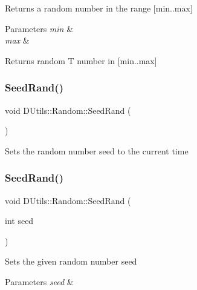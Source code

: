 Returns a random number in the range \mbox{[}min..max\mbox{]} 
\begin{DoxyParams}{Parameters}
{\em min} & \\
\hline
{\em max} & \\
\hline
\end{DoxyParams}
\begin{DoxyReturn}{Returns}
random T number in \mbox{[}min..max\mbox{]} 
\end{DoxyReturn}
\mbox{\label{class_d_utils_1_1_random_a719a6489316343a771e062f0be58050f}} 
\subsubsection{\texorpdfstring{Seed\+Rand()}{SeedRand()}\hspace{0.1cm}{\footnotesize\ttfamily [1/2]}}
{\footnotesize\ttfamily void D\+Utils\+::\+Random\+::\+Seed\+Rand (\begin{DoxyParamCaption}{ }\end{DoxyParamCaption})\hspace{0.3cm}{\ttfamily [static]}}

Sets the random number seed to the current time \mbox{\label{class_d_utils_1_1_random_aec19d58856a0cf0b48d783119a497233}} 
\subsubsection{\texorpdfstring{Seed\+Rand()}{SeedRand()}\hspace{0.1cm}{\footnotesize\ttfamily [2/2]}}
{\footnotesize\ttfamily void D\+Utils\+::\+Random\+::\+Seed\+Rand (\begin{DoxyParamCaption}\item[{int}]{seed }\end{DoxyParamCaption})\hspace{0.3cm}{\ttfamily [static]}}

Sets the given random number seed 
\begin{DoxyParams}{Parameters}
{\em seed} & \\
\hline
\end{DoxyParams}
\mbox{\label{class_d_utils_1_1_random_a168e77d82ce1e66c6759e97ef27adbbc}} 
